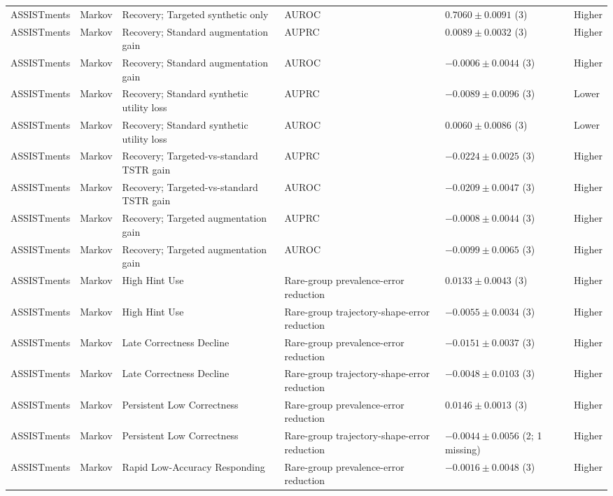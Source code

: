 \begin{longtable}{@{}p{2.25cm}p{2.05cm}p{4.7cm}p{5.0cm}p{2.6cm}p{1.25cm}@{}}
ASSISTments & Markov & Recovery; Targeted synthetic only & AUROC & $0.7060 \mathbin{\pm} 0.0091$ (3) & Higher \\
ASSISTments & Markov & Recovery; Standard augmentation gain & AUPRC & $0.0089 \mathbin{\pm} 0.0032$ (3) & Higher \\
ASSISTments & Markov & Recovery; Standard augmentation gain & AUROC & $-0.0006 \mathbin{\pm} 0.0044$ (3) & Higher \\
ASSISTments & Markov & Recovery; Standard synthetic utility loss & AUPRC & $-0.0089 \mathbin{\pm} 0.0096$ (3) & Lower \\
ASSISTments & Markov & Recovery; Standard synthetic utility loss & AUROC & $0.0060 \mathbin{\pm} 0.0086$ (3) & Lower \\
ASSISTments & Markov & Recovery; Targeted-vs-standard TSTR gain & AUPRC & $-0.0224 \mathbin{\pm} 0.0025$ (3) & Higher \\
ASSISTments & Markov & Recovery; Targeted-vs-standard TSTR gain & AUROC & $-0.0209 \mathbin{\pm} 0.0047$ (3) & Higher \\
ASSISTments & Markov & Recovery; Targeted augmentation gain & AUPRC & $-0.0008 \mathbin{\pm} 0.0044$ (3) & Higher \\
ASSISTments & Markov & Recovery; Targeted augmentation gain & AUROC & $-0.0099 \mathbin{\pm} 0.0065$ (3) & Higher \\
ASSISTments & Markov & High Hint Use & Rare-group prevalence-error reduction & $0.0133 \mathbin{\pm} 0.0043$ (3) & Higher \\
ASSISTments & Markov & High Hint Use & Rare-group trajectory-shape-error reduction & $-0.0055 \mathbin{\pm} 0.0034$ (3) & Higher \\
ASSISTments & Markov & Late Correctness Decline & Rare-group prevalence-error reduction & $-0.0151 \mathbin{\pm} 0.0037$ (3) & Higher \\
ASSISTments & Markov & Late Correctness Decline & Rare-group trajectory-shape-error reduction & $-0.0048 \mathbin{\pm} 0.0103$ (3) & Higher \\
ASSISTments & Markov & Persistent Low Correctness & Rare-group prevalence-error reduction & $0.0146 \mathbin{\pm} 0.0013$ (3) & Higher \\
ASSISTments & Markov & Persistent Low Correctness & Rare-group trajectory-shape-error reduction & $-0.0044 \mathbin{\pm} 0.0056$ (2; 1 missing) & Higher \\
ASSISTments & Markov & Rapid Low-Accuracy Responding & Rare-group prevalence-error reduction & $-0.0016 \mathbin{\pm} 0.0048$ (3) & Higher \\

\end{longtable}
